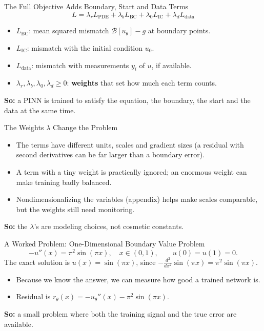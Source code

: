 \documentclass{ntuabeamer}
\begin{document}
\begin{frame}{The Full Objective Adds Boundary, Start and Data Terms}
  \[
    \boxed{L=\lambda_rL_{\mathrm{PDE}}+\lambda_bL_{\mathrm{BC}}+\lambda_0L_{\mathrm{IC}}+\lambda_dL_{\mathrm{data}}}
  \]
  \begin{itemize}
    \item \(L_{\mathrm{BC}}\): mean squared mismatch \(\mathcal B[u_\theta]-g\) at boundary points.
    \item \(L_{\mathrm{IC}}\): mismatch with the initial condition \(u_0\).
    \item \(L_{\mathrm{data}}\): mismatch with measurements \(y_i\) of \(u\), if available.
    \item \(\lambda_r,\lambda_b,\lambda_0,\lambda_d\ge0\): \textbf{weights} that set how much each term counts.
  \end{itemize}
  \textbf{So:} a PINN is trained to satisfy the equation, the boundary, the start and the data at the same time.
\end{frame}

\begin{frame}{The Weights \(\lambda\) Change the Problem}
  \begin{itemize}
    \item The terms have different units, scales and gradient sizes (a residual with second derivatives can be far larger than a boundary error).
    \item A term with a tiny weight is practically ignored; an enormous weight can make training badly balanced.
    \item Nondimensionalizing the variables (appendix) helps make scales comparable, but the weights still need monitoring.
  \end{itemize}
  \textbf{So:} the \(\lambda\)'s are modeling choices, not cosmetic constants.
\end{frame}

\begin{frame}{A Worked Problem: One-Dimensional Boundary Value Problem}
  \[
    -u''(x)=\pi^2\sin(\pi x),\quad x\in(0,1),\qquad u(0)=u(1)=0.
  \]
  The exact solution is \(\boxed{u(x)=\sin(\pi x)}\), since \(-\tfrac{d^2}{dx^2}\sin(\pi x)=\pi^2\sin(\pi x)\).
  \begin{itemize}
    \item Because we know the answer, we can measure how good a trained network is.
    \item Residual is \(r_\theta(x)=-u_\theta''(x)-\pi^2\sin(\pi x)\).
  \end{itemize}
  \textbf{So:} a small problem where both the training signal and the true error are available.
\end{frame}
\end{document}
